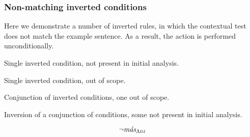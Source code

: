 \subsubsection{Non-matching inverted conditions}

Here we demonstrate a number of inverted rules, in which the contextual test does not match the example sentence. As a result, the action is performed unconditionally.

 Single inverted condition, not present in initial analysis.

 Single inverted condition, out of scope.

 Conjunction of inverted conditions, one out of scope.

 Inversion of a conjunction of conditions, some not present in initial analysis.

\begin{equation}
 \neg{}\text{\em m\'{a}s}_{\text{\sc Adj}} 
\end{equation}








